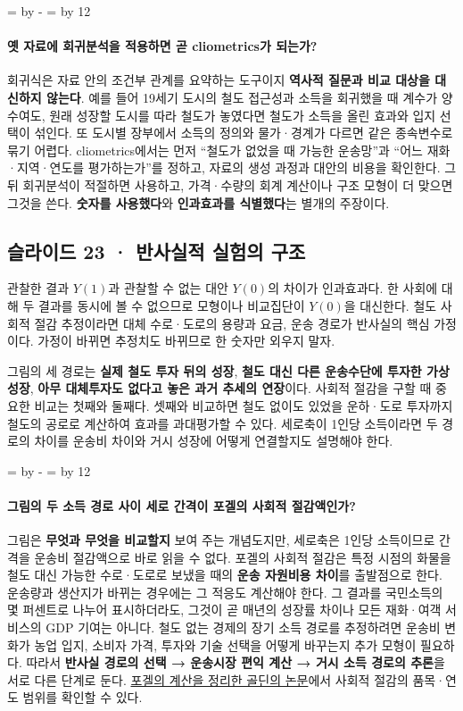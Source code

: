 \documentclass[10pt,a4paper]{article}
\newcommand{\ReserveQuestionSpace}{%
  \par\begingroup
  \dimen0=\pagegoal \advance\dimen0 by -\pagetotal
  \dimen2=\baselineskip \multiply\dimen2 by 12
  \ifdim\dimen0<\dimen2 \newpage\fi
  \endgroup}
\begin{document}
\ReserveQuestionSpace
\paragraph{옛 자료에 회귀분석을 적용하면 곧 cliometrics가 되는가?}
회귀식은 자료 안의 조건부 관계를 요약하는 도구이지 \textbf{역사적 질문과 비교 대상을 대신하지 않는다}. 예를 들어 19세기 도시의 철도 접근성과 소득을 회귀했을 때 계수가 양수여도, 원래 성장할 도시를 따라 철도가 놓였다면 철도가 소득을 올린 효과와 입지 선택이 섞인다. 또 도시별 장부에서 소득의 정의와 물가·경계가 다르면 같은 종속변수로 묶기 어렵다. cliometrics에서는 먼저 “철도가 없었을 때 가능한 운송망”과 “어느 재화·지역·연도를 평가하는가”를 정하고, 자료의 생성 과정과 대안의 비용을 확인한다. 그 뒤 회귀분석이 적절하면 사용하고, 가격·수량의 회계 계산이나 구조 모형이 더 맞으면 그것을 쓴다. \textbf{숫자를 사용했다}와 \textbf{인과효과를 식별했다}는 별개의 주장이다.\par

\subsection{슬라이드 23 · 반사실적 실험의 구조}
관찰한 결과 $Y(1)$과 관찰할 수 없는 대안 $Y(0)$의 차이가 인과효과다. 한 사회에 대해 두 결과를 동시에 볼 수 없으므로 모형이나 비교집단이 $Y(0)$을 대신한다. 철도 사회적 절감 추정이라면 대체 수로·도로의 용량과 요금, 운송 경로가 반사실의 핵심 가정이다. 가정이 바뀌면 추정치도 바뀌므로 한 숫자만 외우지 말자.\par

그림의 세 경로는 \textbf{실제 철도 투자 뒤의 성장}, \textbf{철도 대신 다른 운송수단에 투자한 가상 성장}, \textbf{아무 대체투자도 없다고 놓은 과거 추세의 연장}이다. 사회적 절감을 구할 때 중요한 비교는 첫째와 둘째다. 셋째와 비교하면 철도 없이도 있었을 운하·도로 투자까지 철도의 공로로 계산하여 효과를 과대평가할 수 있다. 세로축이 1인당 소득이라면 두 경로의 차이를 운송비 차이와 거시 성장에 어떻게 연결할지도 설명해야 한다.\par

\ReserveQuestionSpace
\paragraph{그림의 두 소득 경로 사이 세로 간격이 포겔의 사회적 절감액인가?}
그림은 \textbf{무엇과 무엇을 비교할지} 보여 주는 개념도지만, 세로축은 1인당 소득이므로 간격을 운송비 절감액으로 바로 읽을 수 없다. 포겔의 사회적 절감은 특정 시점의 화물을 철도 대신 가능한 수로·도로로 보냈을 때의 \textbf{운송 자원비용 차이}를 출발점으로 한다. 운송량과 생산지가 바뀌는 경우에는 그 적응도 계산해야 한다. 그 결과를 국민소득의 몇 퍼센트로 나누어 표시하더라도, 그것이 곧 매년의 성장률 차이나 모든 재화·여객 서비스의 GDP 기여는 아니다. 철도 없는 경제의 장기 소득 경로를 추정하려면 운송비 변화가 농업 입지, 소비자 가격, 투자와 기술 선택을 어떻게 바꾸는지 추가 모형이 필요하다. 따라서 \textbf{반사실 경로의 선택 → 운송시장 편익 계산 → 거시 소득 경로의 추론}을 서로 다른 단계로 둔다. \href{https://goldin.scholars.harvard.edu/sites/g/files/omnuum5966/files/goldin/files/cliometrics.pdf}{포겔의 계산을 정리한 골딘의 논문}에서 사회적 절감의 품목·연도 범위를 확인할 수 있다.\par
\end{document}
